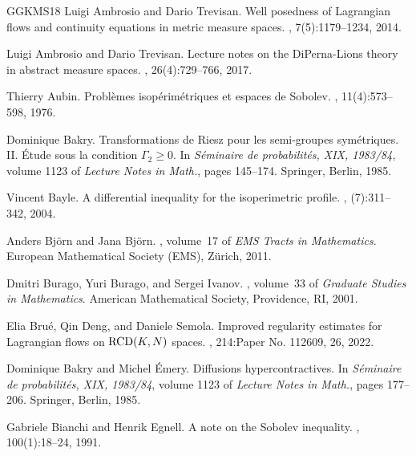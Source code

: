 \documentclass[11pt]{article}
\numberwithin{equation}{section}
\begin{document}
{\begin{thebibliography}{GGKMS18}
Luigi Ambrosio and Dario Trevisan.
\newblock Well posedness of {L}agrangian flows and continuity equations in
  metric measure spaces.
, 7(5):1179--1234, 2014.

Luigi Ambrosio and Dario Trevisan.
\newblock Lecture notes on the {D}i{P}erna-{L}ions theory in abstract measure
  spaces.
, 26(4):729--766, 2017.

Thierry Aubin.
\newblock Probl\`emes isop\'{e}rim\'{e}triques et espaces de {S}obolev.
, 11(4):573--598, 1976.

Dominique Bakry.
\newblock Transformations de {R}iesz pour les semi-groupes sym\'etriques. {II}.
  \'{E}tude sous la condition {$\Gamma_2\geq 0$}.
\newblock In {\em S\'eminaire de probabilit\'es, {XIX}, 1983/84}, volume 1123
  of {\em Lecture Notes in Math.}, pages 145--174. Springer, Berlin, 1985.

Vincent Bayle.
\newblock A differential inequality for the isoperimetric profile.
, (7):311--342, 2004.

Anders Bj{\"o}rn and Jana Bj{\"o}rn.
, volume~17 of {\em
  EMS Tracts in Mathematics}.
\newblock European Mathematical Society (EMS), Z\"urich, 2011.

Dmitri Burago, Yuri Burago, and Sergei Ivanov.
, volume~33 of {\em Graduate Studies
  in Mathematics}.
\newblock American Mathematical Society, Providence, RI, 2001.

Elia Bru\'{e}, Qin Deng, and Daniele Semola.
\newblock Improved regularity estimates for {L}agrangian flows on {${\rm
  RCD}(K,N)$} spaces.
, 214:Paper No. 112609, 26, 2022.

Dominique Bakry and Michel {\'E}mery.
\newblock Diffusions hypercontractives.
\newblock In {\em S\'eminaire de probabilit\'es, {XIX}, 1983/84}, volume 1123
  of {\em Lecture Notes in Math.}, pages 177--206. Springer, Berlin, 1985.

Gabriele Bianchi and Henrik Egnell.
\newblock A note on the {S}obolev inequality.
, 100(1):18--24, 1991.


\end{thebibliography}}
\end{document}
